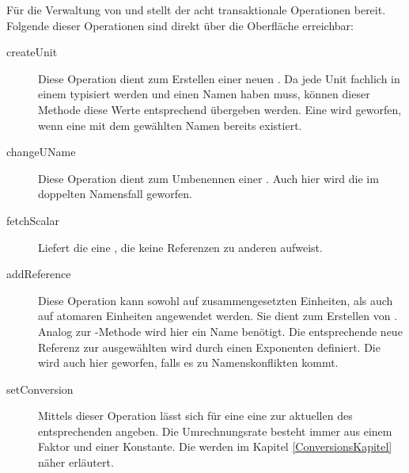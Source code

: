 
Für die Verwaltung von  und  stellt der  acht transaktionale Operationen bereit.
Folgende dieser Operationen sind direkt über die Oberfläche erreichbar:

\begin{description}
\item[createUnit]
Diese Operation dient zum Erstellen einer neuen . Da jede Unit fachlich in einem  typisiert werden und einen Namen haben muss, können dieser Methode diese Werte entsprechend übergeben werden. Eine  wird geworfen, wenn eine  mit dem gewählten Namen bereits existiert.
\item[changeUName]
Diese Operation dient zum Umbenennen einer . Auch hier wird die  im doppelten Namensfall geworfen.
\item[fetchScalar]
Liefert die eine , die keine Referenzen zu anderen  aufweist.
\item[addReference]
Diese Operation kann sowohl auf zusammengesetzten Einheiten, als auch auf atomaren Einheiten angewendet werden. 
Sie dient zum Erstellen von . Analog zur -Methode wird hier ein Name benötigt. Die entsprechende neue Referenz zur ausgewählten  wird durch einen Exponenten definiert. Die  wird auch hier geworfen, falls es zu Namenskonflikten kommt.
\item[setConversion]
Mittels dieser Operation lässt sich für eine  eine  zur aktuellen  des entsprechenden  angeben. Die Umrechnungsrate besteht immer aus einem Faktor und einer Konstante. Die  werden im Kapitel \ref{ConversionsKapitel} näher erläutert.
\end{description}

